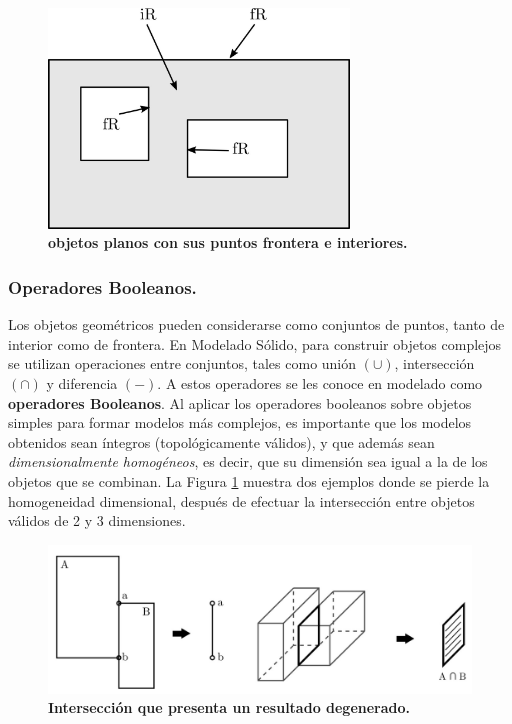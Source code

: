 \begin{figure}[h]
\includegraphics[width=8cm]{Img/GEO/geo-frontera0.jpg}
\centering
\caption{\textbf{\footnotesize{objetos planos con sus puntos frontera e interiores.}}}
\end{figure}

\subsubsection{ Operadores Booleanos. }

Los objetos geométricos pueden considerarse como conjuntos de puntos, tanto de interior como de frontera. En Modelado Sólido, para construir objetos complejos se utilizan operaciones entre conjuntos, tales como unión $(\cup)$, intersección $(\cap)$ y diferencia $(−)$. A estos operadores se les conoce en modelado como \textbf{operadores Booleanos}. Al aplicar los operadores booleanos sobre objetos simples para formar modelos más complejos, es importante que los modelos obtenidos sean íntegros (topológicamente válidos), y que además sean \textit{dimensionalmente homogéneos}, es decir, que su dimensión sea igual a la de los objetos que se combinan. La Figura \ref{fig:booleano0} muestra dos ejemplos donde se pierde la homogeneidad dimensional, después de efectuar la intersección entre objetos válidos de 2 y 3 dimensiones.


\begin{figure}[h]
\includegraphics[width=14cm]{Img/GEO/geo-booleano0.jpg}
\centering
\caption{\textbf{\footnotesize{Intersección que presenta un resultado degenerado.}}}
\label{fig:booleano0}
\end{figure}

